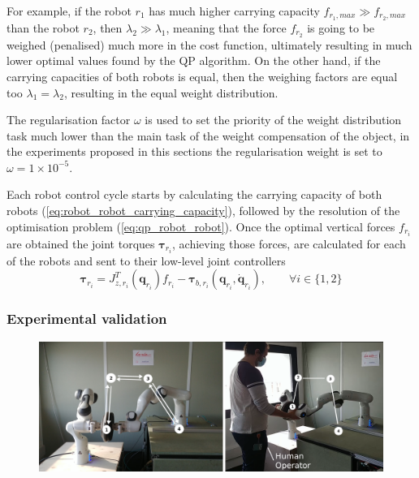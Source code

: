 For example, if the robot $r_1$ has much higher carrying capacity $f_{r_1,max}\gg f_{r_2,max}$ than the robot $r_2$, then $\lambda_2\gg\lambda_1$,  meaning that the force $f_{r_2}$ is going to be weighed (penalised) much more in the cost function, ultimately resulting in much lower optimal values found by the QP algorithm. On the other hand, if the carrying capacities of both robots is equal, then the weighing factors are equal too $\lambda_1=\lambda_2$, resulting in the equal weight distribution.  

The regularisation factor $\omega$ is used to set the priority of the weight distribution task much lower than the main task of the weight compensation of the object, in the experiments proposed in this sections the regularisation weight is set to $\omega=1\times 10^{-5}$.

Each robot control cycle starts by calculating the carrying capacity of both robots (\ref{eq:robot_robot_carrying_capacity}), followed by the resolution of the optimisation problem (\ref{eq:qp_robot_robot}). Once the optimal vertical forces $f_{r_i}$ are obtained the joint torques $\bm{\tau}_{r_i}$, achieving those forces, are calculated for each of the robots and sent to their low-level joint controllers 
\begin{equation}
    \bm{\tau}_{r_i} = J_{z,r_i}^T(\bm{q}_{r_i}){f}_{r_i} - \bm{\tau}_{b,r_i}(\bm{q}_{r_i},\dot{\bm{q}}_{r_i}), \qquad \forall i \in \{1,2\}
\end{equation}

\subsubsection{Experimental validation}
\label{sec:experiment_dual_robto_carrying}
\begin{figure}[!h]
    \centering
    \includegraphics[width=\linewidth]{Papers/images/exp1_explication.png}
    \caption{}
    \label{fig:experiment1}
\end{figure}

